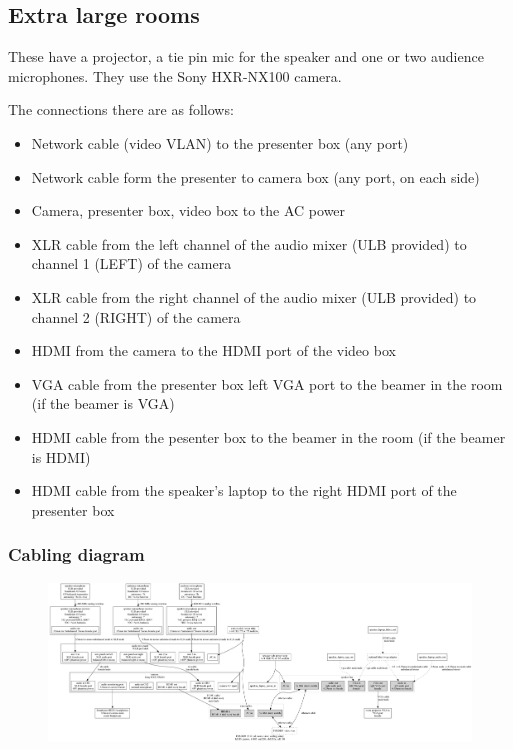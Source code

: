 \documentclass{article}
\begin{document}
\subsection{Extra large rooms}
These have a projector, a tie pin mic for the speaker and one or two audience microphones. They use the Sony HXR-NX100 camera. 

The connections there are as follows:

\begin{itemize}
  \item Network cable (video VLAN) to the presenter box (any port)
  \item Network cable form the presenter to camera box (any port, on each side)
  \item Camera, presenter box, video box to the AC power
  \item XLR cable from the left channel of the audio mixer (ULB provided) to channel 1 (LEFT) of the camera
  \item XLR cable from the right channel of the audio mixer (ULB provided) to channel 2 (RIGHT) of the camera
  \item HDMI from the camera to the HDMI port of the video box
  \item VGA cable from the presenter box left VGA port to the beamer in the room (if the beamer is VGA)
  \item HDMI cable from the pesenter box to the beamer in the room (if the beamer is HDMI)
  \item HDMI cable from the speaker's laptop to the right HDMI port of the presenter box
\end{itemize}

\subsubsection{Cabling diagram}
\begin{figure}[H]
  \begin{sideways}
  \centering
  \includegraphics[width = 200mm]{../../graph/cabling_xxl_rooms.png}
  \end{sideways}
\end{figure}
\end{document}
